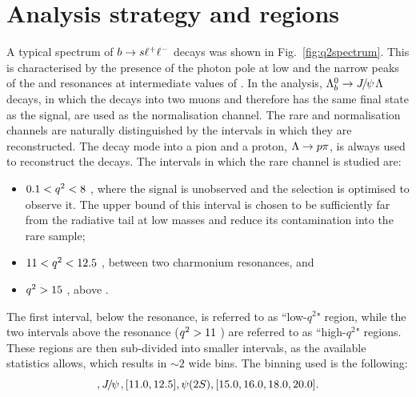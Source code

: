 \section{Analysis strategy and \qsq regions}
\label{sec:Lb_q2choice}

A typical \qsq spectrum of ${b}\rightarrow{\ensuremath{s}}\ell^+ \ell^-$ decays was shown in Fig.~\ref{fig:q2spectrum}.
This is characterised by the presence of the photon pole at low \qsq and the narrow peaks of the \jpsi and \psitwos 
resonances at intermediate values of \qsq. In the analysis, $\Lb\to\jpsi\Lz$ decays, in which the \jpsi decays into two muons
 and therefore has the same final state as the signal, are used as the normalisation channel. The rare and normalisation 
 channels are naturally distinguished by the \qsq intervals in which they are reconstructed. 
The \Lz decay mode into a pion and a proton, $\Lz\to p\pi$, is always used to reconstruct the decays. 
The intervals in which the rare channel is studied are:
\begin{itemize}
\item $0.1 < {q^2} < 8$ \gevgevcccc, where the signal is unobserved and the selection 
is optimised to observe it. The upper bound of this interval is chosen to be sufficiently 
far from the \jpsi radiative tail at low masses and reduce its contamination into the rare sample;
\item $11 < {q^2} < 12.5$ \gevgevcccc, between two charmonium resonances, and 
\item ${q^2}>15$ \gevgevcccc, above \psitwos.
\end{itemize}
The first interval, below the \jpsi resonance, is referred to as ``low-$q^2$" region,
while the two intervals above the \jpsi resonance (${q^2} > 11$ \gevgevcccc) are referred to as ``high-$q^2$" regions.
These regions are then sub-divided into smaller intervals, as the available 
statistics allows, which results in $\sim 2$ \gevgevcccc wide bins. The binning used is the following:
\begin{equation}
[0.1, 2.0, 4.0, 6.0, 8.0], \jpsi, [11.0, 12.5], \psitwos, [15.0, 16.0, 18.0, 20.0].
\end{equation}

